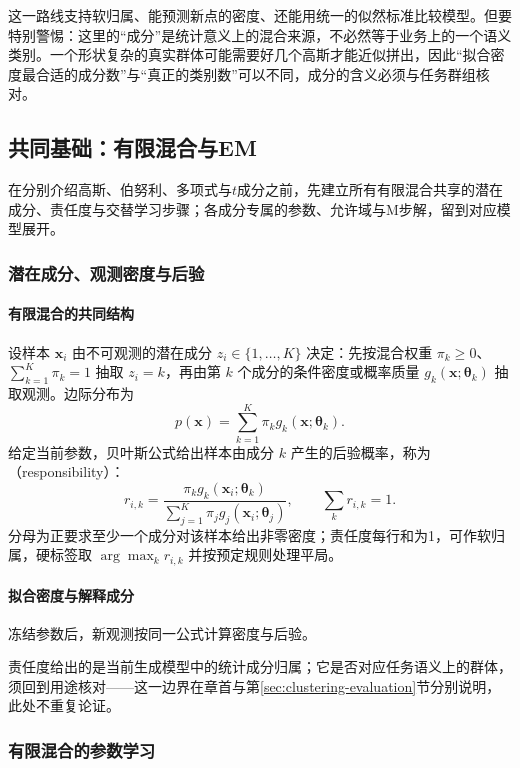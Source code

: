 这一路线支持软归属、能预测新点的密度、还能用统一的似然标准比较模型。但要特别警惕：这里的“成分”是统计意义上的混合来源，不必然等于业务上的一个语义类别。一个形状复杂的真实群体可能需要好几个高斯才能近似拼出，因此“拟合密度最合适的成分数”与“真正的类别数”可以不同，成分的含义必须与任务群组核对。
\subsection{共同基础：有限混合与EM}
\label{sec:clustering-em-common}

在分别介绍高斯、伯努利、多项式与$t$成分之前，先建立所有有限混合共享的潜在成分、责任度与交替学习步骤；各成分专属的参数、允许域与M步解，留到对应模型展开。

\subsubsection{潜在成分、观测密度与后验}

\paragraph{有限混合的共同结构}

设样本 $\bm{x}_i$ 由不可观测的潜在成分 $z_i\in\{1,\ldots,K\}$ 决定：先按混合权重 $\pi_k\geq0$、$\sum_{k=1}^K\pi_k=1$ 抽取 $z_i=k$，再由第 $k$ 个成分的条件密度或概率质量 $g_k(\bm{x};\bm\theta_k)$ 抽取观测。边际分布为
\[
 p(\bm{x})=\sum_{k=1}^K\pi_k g_k(\bm{x};\bm\theta_k).
\]
给定当前参数，贝叶斯公式给出样本由成分 $k$ 产生的后验概率，称为（responsibility）：
\begin{equation}
 r_{i,k}
 =\frac{\pi_k g_k(\bm{x}_i;\bm\theta_k)}
        {\sum_{j=1}^K\pi_j g_j(\bm{x}_i;\bm\theta_j)},
 \qquad \sum_k r_{i,k}=1.
 \label{eq:clustering-responsibility-common}
\end{equation}
分母为正要求至少一个成分对该样本给出非零密度；责任度每行和为1，可作软归属，硬标签取 $\arg\max_k r_{i,k}$ 并按预定规则处理平局。

\paragraph{拟合密度与解释成分}

冻结参数后，新观测按同一公式计算密度与后验。

责任度给出的是当前生成模型中的统计成分归属；它是否对应任务语义上的群体，须回到用途核对——这一边界在章首与第\ref{sec:clustering-evaluation}节分别说明，此处不重复论证。

\subsubsection{有限混合的参数学习}


